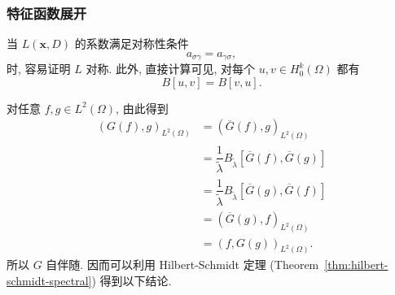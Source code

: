 \subsubsection{特征函数展开}\label{subsec:symmetric-elliptic-eigenfunction-expansions}

当 $L(\bm{x},D)$ 的系数满足对称性条件
\begin{equation}\label{eq:symmetric-elliptic-coefficient-condition}
a_{\sigma\gamma}=a_{\gamma\sigma},
\end{equation}
时, 容易证明 $L$ 对称. 此外, 直接计算可见, 对每个 $u,v\in H_0^k(\Omega)$ 都有
\begin{equation}\label{eq:symmetric-elliptic-bilinear-form-condition}
B[u,v]=B[v,u].
\end{equation}


对任意 $f,g\in L^2(\Omega)$, 由此得到\[\begin{aligned}
(G(f),g)_{L^2(\Omega)}&=(\overline G(f),g)_{L^2(\Omega)}\\
&=\dfrac{1}{\widetilde\lambda}B_{\widetilde\lambda}[\overline G(f),\overline G(g)]\\
&=\dfrac{1}{\widetilde\lambda}B_{\widetilde\lambda}[\overline G(g),\overline G(f)]\\
&=(\overline G(g),f)_{L^2(\Omega)}\\
&=(f,G(g))_{L^2(\Omega)}.
\end{aligned}\]所以 $G$ 自伴随. 因而可以利用 Hilbert-Schmidt 定理 (Theorem~\ref{thm:hilbert-schmidt-spectral}) 得到以下结论.

